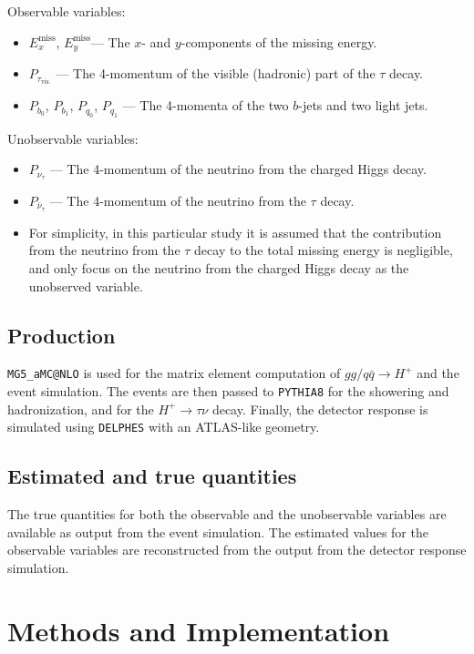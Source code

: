 \documentclass{scrartcl}
\newcommand{\exmiss}{$E_x^\text{miss}$}
\newcommand{\eymiss}{$E_y^\text{miss}$}
\begin{document}
Observable variables:
\begin{itemize}
    \item \exmiss, \eymiss --- The $x$- and $y$-components of the missing energy.
    \item $P_{\tau_\mathrm{vis.}}$ --- The 4-momentum of the visible (hadronic) part of the $\tau$ decay.
    \item $P_{b_0}$, $P_{b_1}$, $P_{q_0}$, $P_{q_1}$ --- The 4-momenta of the two $b$-jets and two light jets.
\end{itemize}

Unobservable variables:
\begin{itemize}
    \item $P_{\nu_\tau}$ --- The 4-momentum of the neutrino from the charged Higgs decay.
    \item $P_{\bar\nu_\tau}$ --- The 4-momentum of the neutrino from the $\tau$ decay.
    \item For simplicity, in this particular study it is assumed that the contribution from the neutrino from the $\tau$ decay to the total missing energy is negligible, and only focus on the neutrino from the charged Higgs decay as the unobserved variable. 
\end{itemize}

\subsection{Production}
\texttt{MG5\_aMC@NLO} \cite{Alwall:2014hca} is used for the matrix element computation of $gg / q \bar q \to H^+$ and the event simulation. The events are then passed to \texttt{PYTHIA8} \cite{Sjöstrand2015159} for the showering and hadronization, and for the $H^+\to \tau\nu$ decay. Finally, the detector response is simulated using \texttt{DELPHES} \cite{Favereau2014} with an ATLAS-like geometry.

\subsection{Estimated and true quantities}
The true quantities for both the observable and the unobservable variables are available as output from the event simulation. The estimated values for the observable variables are reconstructed from the output from the detector response simulation.

\section{Methods and Implementation}
\end{document}
